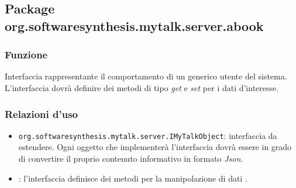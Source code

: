 \subsection{Package org.softwaresynthesis.mytalk.server.abook}\label{sec:abook}


\subsubsection*{Funzione}
Interfaccia rappresentante il comportamento di un generico utente del sistema. L'interfaccia dovrà definire dei metodi di tipo \textit{get} e \textit{set} per i dati d'interesse.

\subsubsection*{Relazioni d'uso}

\begin{itemize}
	\item \texttt{org.softwaresynthesis.mytalk.server.IMyTalkObject}: interfaccia da estendere. Ogni oggetto che implementerà l'interfaccia  dovrà essere in grado di convertire il proprio contenuto informativo in formato \textit{Json}.
	\item {}: l'interfaccia definisce dei metodi per la manipolazione di dati .
\end{itemize}

